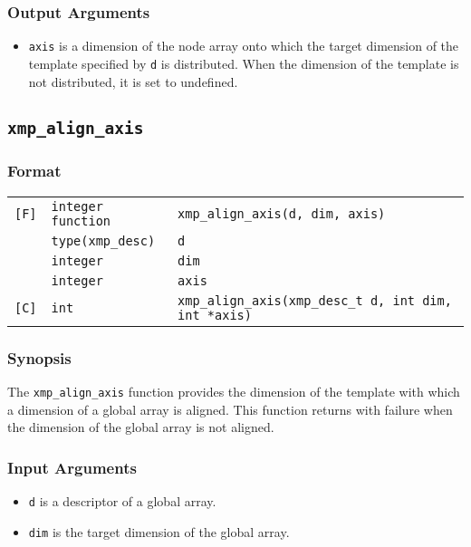 \subsubsection*{Output Arguments}
\begin{itemize}
 \item {\tt axis} is a dimension of the node array onto which 
       the target dimension of the template specified by {\tt d} is
       distributed.  When the dimension of the template is not
       distributed, it is set to undefined.
\end{itemize}


\subsection{\tt xmp\_align\_axis}

\subsubsection*{Format}

\begin{tabular}{lll}

\verb![F]!& {\tt integer function}& {\tt xmp\_align\_axis(d, dim, axis)}\\
          & {\tt type(xmp\_desc)} & {\tt d}\\
          & {\tt integer} & {\tt dim}\\
          & {\tt integer} & {\tt axis}\\

\verb![C]!&  {\tt int}& {\tt xmp\_align\_axis(xmp\_desc\_t d, int dim, int *axis)}\\

\end{tabular}

\subsubsection*{Synopsis}

The {\tt xmp\_align\_axis} function provides the dimension of the
template with which a dimension of a global array is aligned. This
function returns with failure when the dimension of the global array is
not aligned.

\subsubsection*{Input Arguments}
\begin{itemize}
 \item {\tt d} is a descriptor of a global array.
 \item {\tt dim} is the target dimension of the global array.
\end{itemize}

